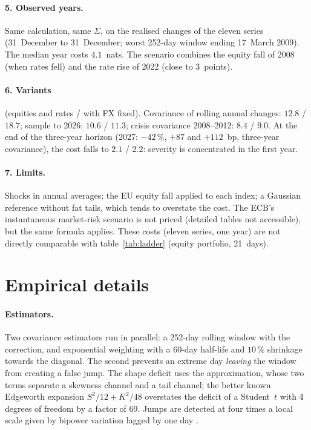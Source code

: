 \documentclass[11pt]{article}
\theoremstyle{definition}
\begin{document}
\paragraph{5. Observed years.} Same calculation, same $\Sigma$, on the
realised changes of the eleven series (31~December to 31~December; worst
252-day window ending 17~March 2009). The median year costs $4.1$~nats. The
scenario combines the equity fall of 2008 (when rates fell) and the rate rise
of 2022 (close to $3$~points).

\paragraph{6. Variants} (equities and rates / with FX fixed). Covariance of
rolling annual changes: $12.8$ / $18.7$; sample to 2026: $10.6$ / $11.3$;
crisis covariance 2008--2012: $8.4$ / $9.0$. At the end of the three-year
horizon (2027: $-42\,\%$, $+87$ and $+112$~bp, three-year covariance), the cost
falls to $2.1$ / $2.2$: severity is concentrated in the first year.

\paragraph{7. Limits.} Shocks in annual averages; the EU equity fall applied
to each index; a Gaussian reference without fat tails, which tends to
overstate the cost. The ECB's instantaneous market-risk scenario is not priced
(detailed tables not accessible), but the same formula applies. These costs
(eleven series, one year) are not directly comparable with
table~\ref{tab:ladder} (equity portfolio, 21~days).

\section{Empirical details}
\label{app:details}

\paragraph{Estimators.} Two covariance estimators run in parallel: a 252-day
rolling window with the \citet{ledoit2004} correction, and exponential
weighting with a 60-day half-life and $10\,\%$ shrinkage towards the diagonal.
The second prevents an extreme day \emph{leaving} the window from creating a
false jump. The shape deficit uses the \citet{hyvarinen1998} approximation,
whose two terms separate a skewness channel and a tail channel; the better
known Edgeworth expansion $S^2/12+K^2/48$ overstates the deficit of a
Student~$t$ with 4 degrees of freedom by a factor of 69. Jumps are detected at
four times a local scale given by bipower variation lagged by one day
\citep{bns2004}.
\end{document}
